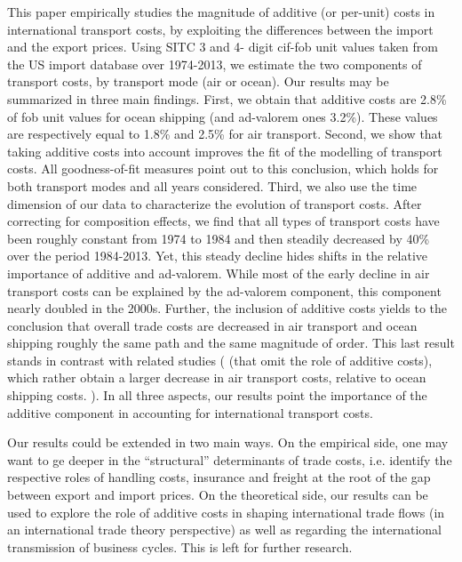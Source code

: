 \documentclass[a4paper,11pt]{article}
\begin{document}
This paper empirically studies the magnitude of additive (or per-unit) costs in international transport costs, by exploiting the differences between the import and the export prices. Using SITC 3 and 4- digit cif-fob unit values taken from the US import database over 1974-2013, we estimate the two components of transport costs, by transport mode (air or ocean).  Our results may be summarized in three main findings. First, we obtain that additive costs are 2.8\% of fob unit values for ocean shipping (and ad-valorem ones 3.2\%). These values are respectively equal to 1.8\% and 2.5\% for air transport. Second, we show that taking additive costs into account improves the fit of the modelling of transport costs. All goodness-of-fit measures point out to this conclusion, which holds for both transport modes and all years considered. Third, we also use the time dimension of our data to characterize the evolution of transport costs. After correcting for composition effects, we find that all types of transport costs have been roughly constant from 1974 to 1984 and then steadily decreased by 40\% over the period 1984-2013. Yet, this steady decline hides shifts in the relative importance of additive and ad-valorem. While most of the early decline in air transport costs can be explained by the ad-valorem component, this component nearly doubled in the 2000s. Further, the inclusion of additive costs yields to the conclusion that overall trade costs are decreased in air transport and ocean shipping roughly the same path and the same magnitude of order. This last result stands in contrast with related studies (\citealp{hummels2007} (that omit the role of additive costs), which rather obtain a larger decrease in air transport costs, relative to ocean shipping costs. \citealp{Behar_Venables}). In all three aspects, our results point the importance of the additive component in accounting for international transport costs. 

Our results could be extended in two main ways. On the empirical side, one may want to ge deeper in the ``structural'' determinants of trade costs, i.e. identify the respective roles of handling costs, insurance and freight at the root of the gap between export and import prices. On the theoretical side, our results can be used to explore the role of additive costs in shaping international trade flows (in an international trade theory perspective) as well as regarding the international transmission of business cycles. This is left for further research.
\end{document}
